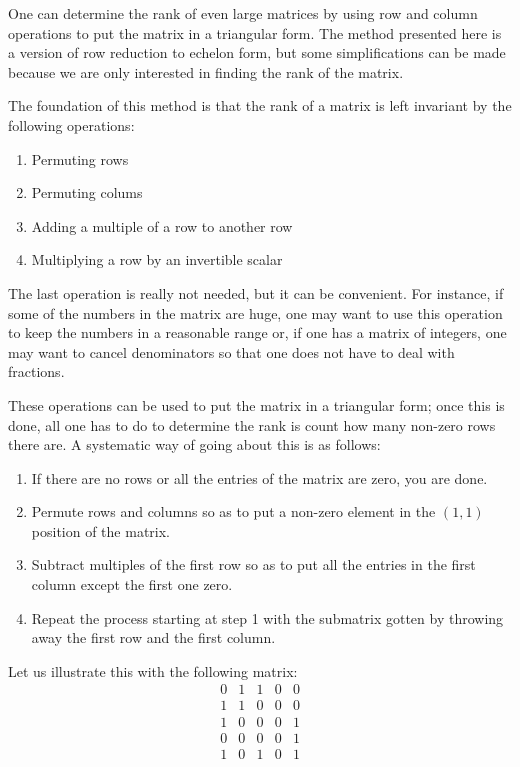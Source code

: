 \documentclass[12pt]{article}
\begin{document}
One can determine the rank of even large matrices by using row and
column operations to put the matrix in a triangular form.  The method
presented here is a version of row reduction to echelon form,
but some simplifications can be made because we are only interested
in finding the rank of the matrix.

The foundation of this method is that the rank of a matrix is left
invariant by the following operations:
\begin{enumerate}
\item Permuting rows
\item Permuting colums
\item Adding a multiple of a row to another row
\item Multiplying a row by an invertible scalar
\end{enumerate}
The last operation is really not needed, but it can be convenient.
For instance, if some of the numbers in the matrix are huge, one
may want to use this operation to keep the numbers in a reasonable
range or, if one has a matrix of integers, one may want to cancel
denominators so that one does not have to deal with fractions.

These operations can be used to put the matrix in a triangular
form; once this is done, all one has to do to determine the rank
is count how many non-zero rows there are.  A systematic way of
going about this is as follows:
\begin{enumerate}
\item If there are no rows or all the entries of the matrix are
zero, you are done.
\item Permute rows and columns so as to put a non-zero element in
the $(1,1)$ position of the matrix.
\item Subtract multiples of the first row so as to put all the
entries in the first column except the first one zero.
\item Repeat the process starting at step 1 with the submatrix 
gotten by throwing away the first row and the first column.
\end{enumerate}

Let us illustrate this with the following matrix:
\[
\begin{matrix}
0 & 1 & 1 & 0 & 0 \\
1 & 1 & 0 & 0 & 0 \\
1 & 0 & 0 & 0 & 1 \\
0 & 0 & 0 & 0 & 1 \\
1 & 0 & 1 & 0 & 1
\end{matrix}
\]
\end{document}
